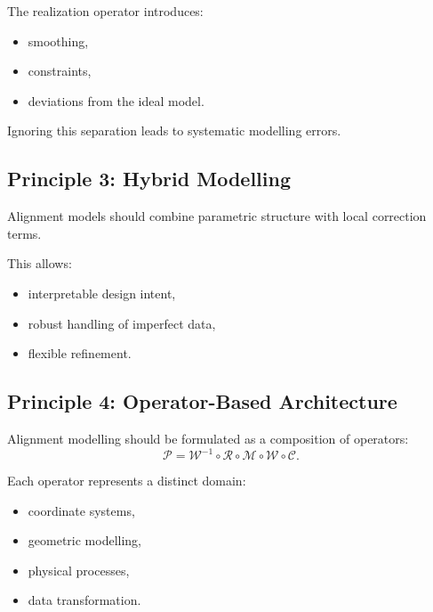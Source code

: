 The realization operator introduces:
\begin{itemize}
\item smoothing,
\item constraints,
\item deviations from the ideal model.
\end{itemize}

Ignoring this separation leads to systematic modelling errors.


\subsection{Principle 3: Hybrid Modelling}

\begin{proposition}
Alignment models should combine parametric structure with local
correction terms.
\end{proposition}

This allows:
\begin{itemize}
\item interpretable design intent,
\item robust handling of imperfect data,
\item flexible refinement.
\end{itemize}


\subsection{Principle 4: Operator-Based Architecture}

\begin{proposition}
Alignment modelling should be formulated as a composition of operators:
\[
\mathcal{P}
=
\mathcal{W}^{-1}
\circ
\mathcal{R}
\circ
\mathcal{M}
\circ
\mathcal{W}
\circ
\mathcal{C}.
\]
\end{proposition}

Each operator represents a distinct domain:
\begin{itemize}
\item coordinate systems,
\item geometric modelling,
\item physical processes,
\item data transformation.
\end{itemize}


